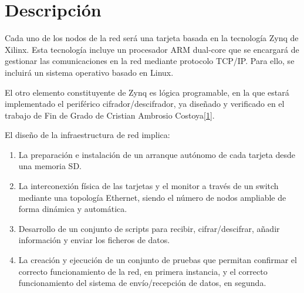 \section{Descripción}
Cada uno de los nodos de la red será una tarjeta basada en la tecnología Zynq de Xilinx. Esta tecnología incluye un procesador ARM dual-core que se encargará de gestionar las
comunicaciones en la red mediante protocolo TCP/IP. Para ello, se incluirá un sistema operativo basado en Linux.

El otro elemento constituyente de Zynq es lógica programable, en la que estará implementado el periférico cifrador/descifrador, ya diseñado y verificado en el trabajo de Fin de Grado de Cristian Ambrosio Costoya\hyperlink{1}{[1]}.

El diseño de la infraestructura de red implica:
\begin{enumerate}
	\item La preparación e instalación de un arranque autónomo de cada tarjeta desde una memoria SD.
	\item La interconexión física de las tarjetas y el monitor a través de
	un switch mediante una topología Ethernet, siendo el número de nodos ampliable de forma dinámica y automática.
	\item Desarrollo de un conjunto de scripts para recibir, cifrar/descifrar, añadir información y enviar los ficheros de datos.
	\item La creación y ejecución de un conjunto de pruebas que permitan confirmar
	el correcto funcionamiento de la red, en primera instancia, y el correcto funcionamiento del sistema de envío/recepción de datos, en segunda.
\end{enumerate}